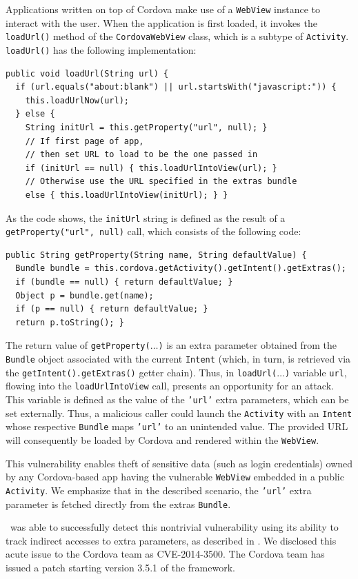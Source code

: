 Applications written on top of Cordova make use of a {\tt WebView} instance to interact with the user. When the application is first loaded, it invokes the {\tt loadUrl()} method of the {\tt CordovaWebView} class, which is a subtype of {\tt Activity}. {\tt loadUrl()} has the following implementation:
\begin{lstlisting}[showstringspaces=false]
public void loadUrl(String url) {
  if (url.equals("about:blank") || url.startsWith("javascript:")) {
    this.loadUrlNow(url);
  } else {
    String initUrl = this.getProperty("url", null); }
    // If first page of app, 
    // then set URL to load to be the one passed in
    if (initUrl == null) { this.loadUrlIntoView(url); }
    // Otherwise use the URL specified in the extras bundle
    else { this.loadUrlIntoView(initUrl); } }
\end{lstlisting}

As the code shows, the {\tt initUrl} string is defined as the result of a  {\tt getProperty("url", null)} call, which consists of the following code:
\begin{lstlisting}[showstringspaces=false]
public String getProperty(String name, String defaultValue) {
  Bundle bundle = this.cordova.getActivity().getIntent().getExtras();
  if (bundle == null) { return defaultValue; }
  Object p = bundle.get(name);
  if (p == null) { return defaultValue; }
  return p.toString(); }
\end{lstlisting}
The return value of {\tt getProperty($\ldots$)} is an extra parameter obtained from the {\tt Bundle} object associated with the current {\tt Intent} (which, in turn, is retrieved via the {\tt getIntent().getExtras()} getter chain). Thus, in {\tt loadUrl($\ldots$)} variable {\tt url}, flowing into the {\tt loadUrlIntoView} call, presents an opportunity for an attack. This variable is defined
as the value of the {\tt 'url'} extra parameters, which can be set externally.  
Thus, a malicious caller could launch the {\tt Activity} with an {\tt Intent} whose respective {\tt Bundle} maps {\tt 'url'} to an unintended value. The provided URL will consequently be loaded by Cordova and rendered within the {\tt WebView}.

This vulnerability enables theft of sensitive data (such as login credentials) owned by any Cordova-based app having the vulnerable {\tt WebView} embedded in a public {\tt Activity}.
We emphasize that in the described scenario, the {\tt 'url'} extra parameter is fetched directly from the extras {\tt Bundle}. 

\Tool\ was able to successfully detect this nontrivial vulnerability using its ability to track indirect accesses to extra parameters, as described in .
We  disclosed this acute issue to the Cordova team as CVE-2014-3500. The Cordova team has issued a patch starting version 3.5.1 of the framework.

